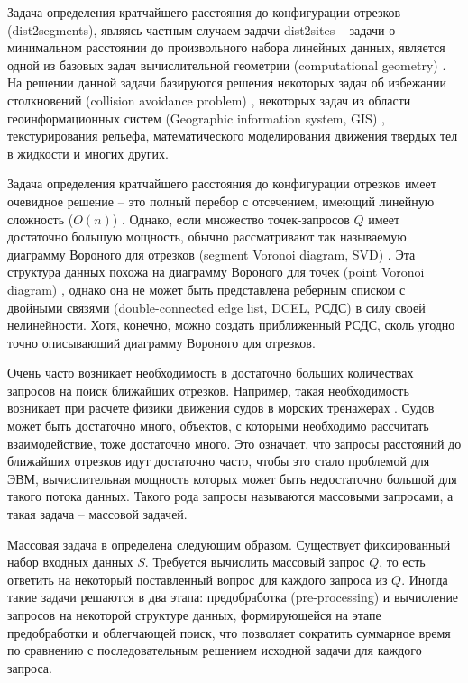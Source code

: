 \startprefacepage

Задача определения кратчайшего расстояния до конфигурации отрезков
(dist2segments), являясь частным случаем задачи dist2sites -- задачи о
минимальном расстоянии до произвольного набора линейных данных,
является одной из базовых задач вычислительной геометрии (computational
geometry) \cite{PrSh}. На решении данной задачи базируются решения некоторых задач
об избежании столкновений (collision avoidance problem) \cite{MarNav}, некоторых задач
из области геоинформационных систем (Geographic information system, GIS) \cite{CGinGIS},
текстурирования рельефа, математического моделирования движения твердых
тел в жидкости и многих других.

Задача определения кратчайшего расстояния до конфигурации
отрезков имеет очевидное решение -- это полный
перебор с отсечением, имеющий линейную сложность ($O(n)$) \cite{DnCG}. Однако, если
множество точек-запросов $Q$ имеет достаточно большую мощность, обычно
рассматривают так называемую диаграмму Вороного для отрезков (segment
Voronoi diagram, SVD) \cite{PrSh, CGAL}. Эта структура данных похожа на диаграмму
Вороного для точек (point Voronoi diagram) \cite{PrSh, CGAL}, однако она не может быть
представлена реберным списком с двойными связями (double-connected edge
list, DCEL, РСДС) \cite{PrSh, CGAL} в силу своей нелинейности. Хотя, конечно, можно
создать приближенный РСДС, сколь угодно точно описывающий диаграмму
Вороного для отрезков.

Очень часто возникает необходимость в достаточно
больших количествах запросов на поиск ближайших отрезков.
Например, такая необходимость возникает при расчете физики движения судов в морских
тренажерах \cite{MarNav}. Судов может быть достаточно много, объектов, с которыми
необходимо рассчитать взаимодействие, тоже достаточно много. Это означает,
что запросы расстояний до ближайших отрезков идут достаточно часто, чтобы это стало проблемой
для ЭВМ, вычислительная мощность которых может быть недостаточно
большой для такого потока данных. Такого рода запросы называются
массовыми запросами, а такая задача -- массовой задачей.

Массовая задача в \cite{PrSh} определена следующим образом. Существует
фиксированный набор входных данных $S$. Требуется вычислить массовый
запрос $Q$, то есть ответить на некоторый поставленный вопрос для каждого
запроса из $Q$. Иногда такие задачи решаются в два этапа: предобработка 
(pre-processing) и вычисление запросов на некоторой структуре данных,
формирующейся на этапе предобработки и облегчающей поиск, что позволяет
сократить суммарное время по сравнению с последовательным решением
исходной задачи для каждого запроса.

